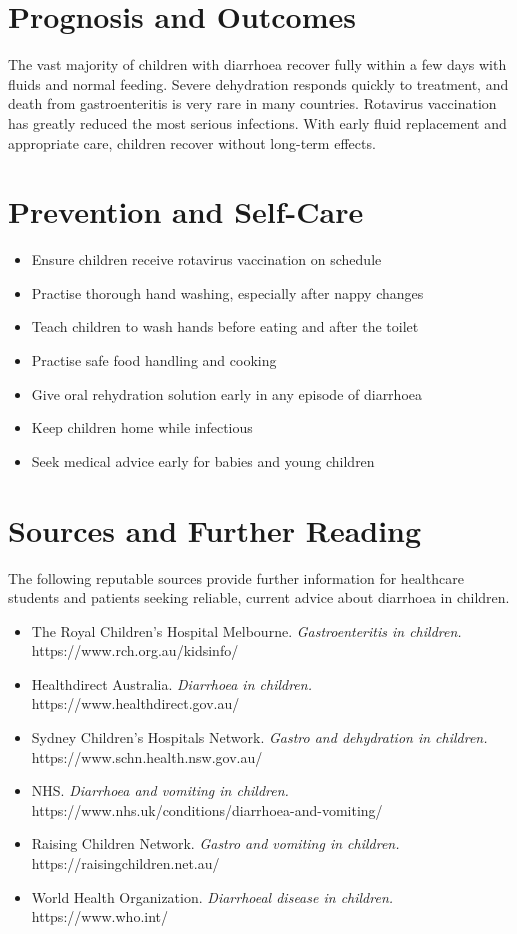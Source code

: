 \section*{Prognosis and Outcomes}
The vast majority of children with diarrhoea recover fully within a few days with fluids and normal feeding. Severe dehydration responds quickly to treatment, and death from gastroenteritis is very rare in many countries. Rotavirus vaccination has greatly reduced the most serious infections. With early fluid replacement and appropriate care, children recover without long-term effects.

\section*{Prevention and Self-Care}
\begin{itemize}
    \item Ensure children receive rotavirus vaccination on schedule
    \item Practise thorough hand washing, especially after nappy changes
    \item Teach children to wash hands before eating and after the toilet
    \item Practise safe food handling and cooking
    \item Give oral rehydration solution early in any episode of diarrhoea
    \item Keep children home while infectious
    \item Seek medical advice early for babies and young children
\end{itemize}

\section*{Sources and Further Reading}
The following reputable sources provide further information for healthcare students and patients seeking reliable, current advice about diarrhoea in children.

\begin{itemize}
    \item The Royal Children's Hospital Melbourne. \textit{Gastroenteritis in children.} https://www.rch.org.au/kidsinfo/
    \item Healthdirect Australia. \textit{Diarrhoea in children.} https://www.healthdirect.gov.au/
    \item Sydney Children's Hospitals Network. \textit{Gastro and dehydration in children.} https://www.schn.health.nsw.gov.au/
    \item NHS. \textit{Diarrhoea and vomiting in children.} https://www.nhs.uk/conditions/diarrhoea-and-vomiting/
    \item Raising Children Network. \textit{Gastro and vomiting in children.} https://raisingchildren.net.au/
    \item World Health Organization. \textit{Diarrhoeal disease in children.} https://www.who.int/
\end{itemize}
